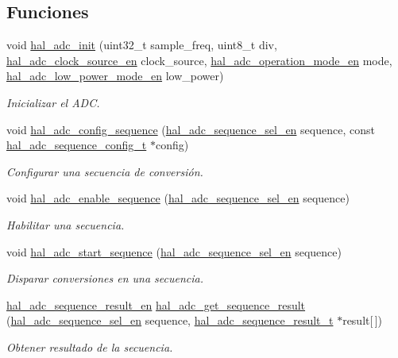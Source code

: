 \subsection*{Funciones}
\begin{DoxyCompactItemize}
\item 
void \hyperlink{group__ADC_gad44f4eb2585a9292ff4b66ceceb2f75f}{hal\+\_\+adc\+\_\+init} (uint32\+\_\+t sample\+\_\+freq, uint8\+\_\+t div, \hyperlink{group__ADC_gaee7bd99d368af2a425a9954a9e811a51}{hal\+\_\+adc\+\_\+clock\+\_\+source\+\_\+en} clock\+\_\+source, \hyperlink{group__ADC_ga21b6c00c4fe5d9ba0d36440222e5d210}{hal\+\_\+adc\+\_\+operation\+\_\+mode\+\_\+en} mode, \hyperlink{group__ADC_gaf1570443ca3570a7ae83b90307bbecca}{hal\+\_\+adc\+\_\+low\+\_\+power\+\_\+mode\+\_\+en} low\+\_\+power)
\begin{DoxyCompactList}\small\item\em Inicializar el A\+DC. \end{DoxyCompactList}\item 
void \hyperlink{group__ADC_gadcef726eaa85af74ade96c14f9a48feb}{hal\+\_\+adc\+\_\+config\+\_\+sequence} (\hyperlink{group__ADC_ga9297d7b14d7018a94bce94f0103d8559}{hal\+\_\+adc\+\_\+sequence\+\_\+sel\+\_\+en} sequence, const \hyperlink{structhal__adc__sequence__config__t}{hal\+\_\+adc\+\_\+sequence\+\_\+config\+\_\+t} $\ast$config)
\begin{DoxyCompactList}\small\item\em Configurar una secuencia de conversión. \end{DoxyCompactList}\item 
void \hyperlink{group__ADC_ga678f2df33d79c246b175d0dd36405430}{hal\+\_\+adc\+\_\+enable\+\_\+sequence} (\hyperlink{group__ADC_ga9297d7b14d7018a94bce94f0103d8559}{hal\+\_\+adc\+\_\+sequence\+\_\+sel\+\_\+en} sequence)
\begin{DoxyCompactList}\small\item\em Habilitar una secuencia. \end{DoxyCompactList}\item 
void \hyperlink{group__ADC_ga154950a81b5f589fde0139178ab1dcf3}{hal\+\_\+adc\+\_\+start\+\_\+sequence} (\hyperlink{group__ADC_ga9297d7b14d7018a94bce94f0103d8559}{hal\+\_\+adc\+\_\+sequence\+\_\+sel\+\_\+en} sequence)
\begin{DoxyCompactList}\small\item\em Disparar conversiones en una secuencia. \end{DoxyCompactList}\item 
\hyperlink{group__ADC_ga7761986f9c56b809bce1299c6c32eddd}{hal\+\_\+adc\+\_\+sequence\+\_\+result\+\_\+en} \hyperlink{group__ADC_ga2abe86b92546f8f4726dd65a7a9ddc0d}{hal\+\_\+adc\+\_\+get\+\_\+sequence\+\_\+result} (\hyperlink{group__ADC_ga9297d7b14d7018a94bce94f0103d8559}{hal\+\_\+adc\+\_\+sequence\+\_\+sel\+\_\+en} sequence, \hyperlink{group__ADC_structhal__adc__sequence__result__t}{hal\+\_\+adc\+\_\+sequence\+\_\+result\+\_\+t} $\ast$result\mbox{[}$\,$\mbox{]})
\begin{DoxyCompactList}\small\item\em Obtener resultado de la secuencia. \end{DoxyCompactList}\end{DoxyCompactItemize}


